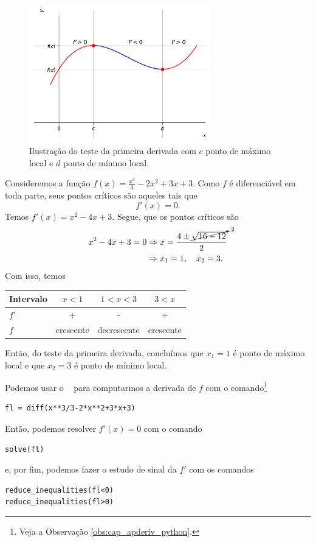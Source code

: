 \begin{figure}[H]
  \centering
  \includegraphics[width=0.7\textwidth]{./cap_apderiv/dados/fig_tder1/fig_tder1}
  \caption{Ilustração do teste da primeira derivada com $c$ ponto de máximo local e $d$ ponto de mínimo local.}
  \label{fig:tder1}
\end{figure}

\begin{ex}
  Consideremos a função $\displaystyle f(x)=\frac{x^3}{3}-2x^2+3x+3$. Como $f$ é diferenciável em toda parte, seus pontos críticos são aqueles tais que
  \begin{equation}
    f'(x)=0.
  \end{equation}
  Temos $f'(x) = x^2 - 4x + 3$. Segue, que os pontos críticos são
  \begin{align}
    x^2-4x+3=0 &\Rightarrow x = \frac{4\pm \cancelto{2}{\sqrt{16-12}}}{2} \\
    &\Rightarrow x_1 = 1,\quad x_2=3.
  \end{align}
  Com isso, temos
  \begin{center}
  \begin{tabular}{lccc}\hline
    Intervalo & $x<1$ & $1<x<3$ & $3<x$ \\\hline
    $f'$ & + & - & + \\
    $f$ & crescente & decrescente & crescente\\\hline
  \end{tabular}
\end{center}
  Então, do teste da primeira derivada, concluímos que $x_1=1$ é ponto de máximo local e que $x_2=3$ é ponto de mínimo local.

  \ifispython
  Podemos usar o \sympy~ para computarmos a derivada de $f$ com o comando\footnote{Veja a Observação \ref{obs:cap_apderiv_python}.}
\begin{verbatim}
fl = diff(x**3/3-2*x**2+3*x+3)
\end{verbatim}
  Então, podemos resolver $f'(x)=0$ com o comando
\begin{verbatim}
solve(fl)
\end{verbatim}
  e, por fim, podemos fazer o estudo de sinal da $f'$ com os comandos
\begin{verbatim}
reduce_inequalities(fl<0)
reduce_inequalities(fl>0)
\end{verbatim}
  \fi
\end{ex}

